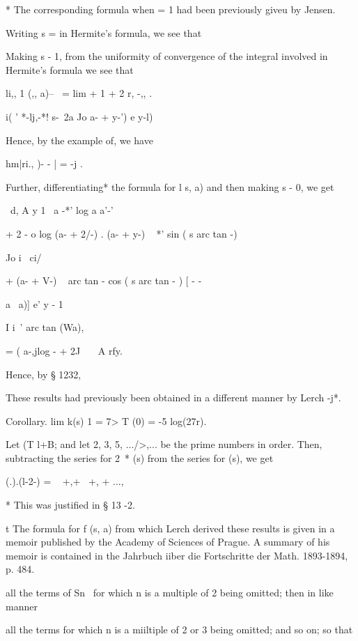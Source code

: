 * The corresponding formula when = 1 had been previously giveu by
Jensen.

%
%

Writing s = in Hermite's
formula, we see that

Making s - 1, from the uniformity of convergence of the integral
involved in Hermite's formula we see that

li,, 1 (,, a)-- \ = lim + 1 + 2 r, -,, .

  i( ' *-lj,-*! s-\ 2a Jo a- + y-') e y-l)

Hence, by the example of, we have

hm|ri., )- - | = -j .

Further, differentiating* the formula for l s, a) and then making s -
0, we get

\ d, A y 1 \, a -*' log a a'-'

+ 2 - o log (a- + 2/-) . (a- + y-) ~ *' sin ( s arc tan -)

Jo i \ ci/

+ (a- + V-) ~ arc tan - cos ( s arc tan - ) [ - -

    a \ a)] e' y - 1

I i\, ' arc tan (Wa),

= ( a-,jlog - + 2J \ \ \ A rfy.

Hence, by § 1232,

These results had previously been obtained in a different manner by
Lerch -j*.

Corollary. lim k(s) 1 = 7> T (0) = -5 log(27r).


Let (T l+B; and let 2, 3, 5, .../>,... be the prime numbers in order.
Then, subtracting the series for 2~* (s) from the series for (s), we
get

 (.).(l-2-) = ~ +,+~ +, + ...,

* This was justified in § 13 -2.

t The formula for f (s, a) from which Lerch derived these results is
given in a memoir published by the Academy of Sciences of Prague. A
summary of his memoir is contained in the Jahrbuch iiber die
Fortschritte der Math. 1893-1894, p. 484.

%
%

all the terms of Sn~ for which n is a multiple of 2 being omitted;
then in like manner

all the terms for which n is a miiltiple of 2 or 3 being omitted; and
so on; so that

